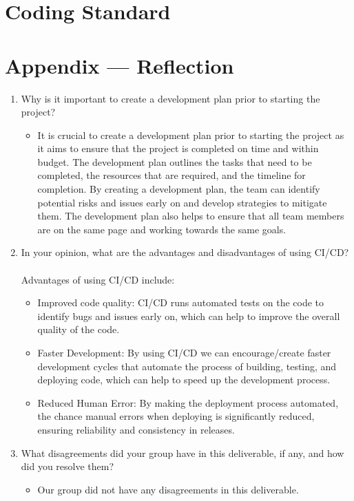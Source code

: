 \documentclass{article}
\begin{document}

\section{Coding Standard}


\newpage{}

\section*{Appendix --- Reflection}



\begin{enumerate}
    \item Why is it important to create a development plan prior to starting the
    project?
    \begin{itemize}
        \item It is crucial to create a development plan prior to starting the project as it aims to ensure that the project is completed on time and within budget. The development plan outlines the tasks that need to be completed, the resources that are required, and the timeline for completion. By creating a development plan, the team can identify potential risks and issues early on and develop strategies to mitigate them. The development plan also helps to ensure that all team members are on the same page and working towards the same goals.
    \end{itemize}
    \item In your opinion, what are the advantages and disadvantages of using
    CI/CD? \\ \\
        Advantages of using CI/CD include:
        \begin{itemize}
        \item Improved code quality: CI/CD runs automated tests on the code to identify bugs and issues early on, which can help to improve the overall quality of the code.
        \item Faster Development: By using CI/CD we can encourage/create faster development cycles that automate the process of building, testing, and deploying code, which can help to speed up the development process.
        \item Reduced Human Error: By making the deployment process automated, the chance manual errors when deploying is significantly reduced, ensuring reliability and consistency in releases.
        \end{itemize}
    \item What disagreements did your group have in this deliverable, if any,
    and how did you resolve them?
    \begin{itemize}
        \item Our group did not have any disagreements in this deliverable.
    \end{itemize}
\end{enumerate}
\end{document}
